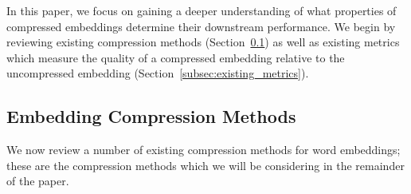 In this paper, we focus on gaining a deeper understanding of what properties of compressed embeddings determine their downstream performance.
We begin by reviewing existing compression methods (Section~\ref{subsec:existing_methods}) as well as existing metrics which measure the quality of a compressed embedding relative to the uncompressed embedding (Section~\ref{subsec:existing_metrics}).


\subsection{Embedding Compression Methods}
\label{subsec:existing_methods}
We now review a number of existing compression methods for word embeddings;
these are the compression methods which we will be considering in the remainder of the paper.


